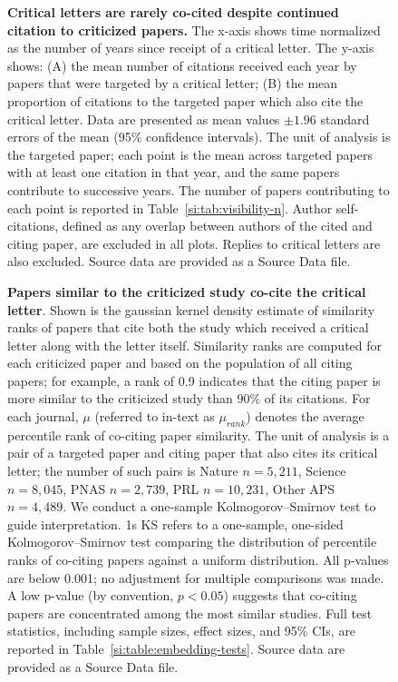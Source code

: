 \documentclass[12pt,a4paper]{article}
\numberwithin{equation}{section}
\begin{document}
\begin{figure}[h!]
    \centering
    \caption{
    \textbf{Critical letters are rarely co-cited despite continued citation to criticized papers.}
    The x-axis shows time normalized as the number of years since receipt of a critical letter. 
    The y-axis shows:
    (A) the mean number of citations received each year by papers that were targeted by a critical letter;
    (B) the mean proportion of citations to the targeted paper which also cite the critical letter.
    Data are presented as mean values $\pm 1.96$ standard errors of the mean (95\% confidence intervals). The unit of analysis is the targeted paper; each point is the mean across targeted papers with at least one citation in that year, and the same papers contribute to successive years.
    The number of papers contributing to each point is reported in Table~\ref*{si:tab:visibility-n}.
    Author self-citations, defined as any overlap between authors of the cited and citing paper, are excluded in all plots.
    Replies to critical letters are also excluded.
    Source data are provided as a Source Data file.
    }
    \label{fig:visibility}
\end{figure}


\begin{figure}
    \centering
    \caption{
    \textbf{Papers similar to the criticized study co-cite the critical letter}.
    Shown is the gaussian kernel density estimate of similarity ranks of papers that cite both the study which received a critical letter along with the letter itself.
    Similarity ranks are computed for each criticized paper and based on the population of all citing papers;
    for example, a rank of 0.9 indicates that the citing paper is more similar to the criticized study than 90\% of its citations.
    For each journal, $\mu$ (referred to in-text as $\mu_{rank}$) denotes the average percentile rank of co-citing paper similarity.
    The unit of analysis is a pair of a targeted paper and citing paper that also cites its critical letter; the number of such pairs is Nature $n = 5{,}211$, Science $n = 8{,}045$, PNAS $n = 2{,}739$, PRL $n = 10{,}231$, Other APS $n = 4{,}489$.
    We conduct a one-sample Kolmogorov–Smirnov test to guide interpretation. 1s KS refers to a one-sample, one-sided Kolmogorov–Smirnov test comparing the distribution of percentile ranks of co-citing papers against a uniform distribution. 
    All p-values are below 0.001; no adjustment for multiple comparisons was made.
    A low p-value (by convention, $p < 0.05$) suggests that co-citing papers are concentrated among the most similar studies. Full test statistics, including sample sizes, effect sizes, and 95\% CIs, are reported in Table~\ref*{si:table:embedding-tests}.
    Source data are provided as a Source Data file.
    }
    \label{fig:embedding}
\end{figure}
\end{document}
